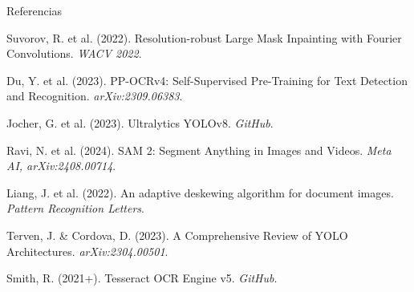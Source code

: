 \documentclass[aspectratio=169, 11pt]{beamer}
\begin{document}
\begin{frame}[allowframebreaks]{Referencias}
  \scriptsize
  \begin{enumerate}[label={[\arabic*]}, leftmargin=1.8em, itemsep=4pt]
    \item Suvorov, R. et al. (2022). Resolution-robust Large Mask Inpainting with Fourier Convolutions. \textit{WACV 2022}.
    \item Du, Y. et al. (2023). PP-OCRv4: Self-Supervised Pre-Training for Text Detection and Recognition. \textit{arXiv:2309.06383}.
    \item Jocher, G. et al. (2023). Ultralytics YOLOv8. \textit{GitHub}.
    \item Ravi, N. et al. (2024). SAM 2: Segment Anything in Images and Videos. \textit{Meta AI, arXiv:2408.00714}.
    \item Liang, J. et al. (2022). An adaptive deskewing algorithm for document images. \textit{Pattern Recognition Letters}.
    \item Terven, J. \& Cordova, D. (2023). A Comprehensive Review of YOLO Architectures. \textit{arXiv:2304.00501}.
    \item Smith, R. (2021+). Tesseract OCR Engine v5. \textit{GitHub}.
  \end{enumerate}
\end{frame}
\end{document}
